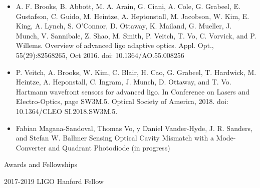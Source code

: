 \documentclass[12pt,suthesis]{report}
\begin{document}
\begin{itemize}
	\item{A. F. Brooks, B. Abbott, M. A. Arain, G. Ciani, A. Cole, G. Grabeel, E. Gustafson,
	C. Guido, M. Heintze, A. Heptonstall, M. Jacobson, W. Kim, E. King, A. Lynch,
	S. O’Connor, D. Ottaway, K. Mailand, G. Mueller, J. Munch, V. Sannibale, Z. Shao,
	M. Smith, P. Veitch, T. Vo, C. Vorvick, and P. Willems. Overview of advanced ligo
	adaptive optics. Appl. Opt., 55(29):8256{8265, Oct 2016. doi: 10.1364/AO.55.008256}}
	\item{P. Veitch, A. Brooks, W. Kim, C. Blair, H. Cao, G. Grabeel, T. Hardwick, M. Heintze,
	A. Heponstall, C. Ingram, J. Munch, D. Ottaway, and T. Vo. Hartmann wavefront
	sensors for advanced ligo. In Conference on Lasers and Electro-Optics, page SW3M.5.
	Optical Society of America, 2018. doi: 10.1364/CLEO SI.2018.SW3M.5.}
	\item{Fabian Magana-Sandoval, Thomas Vo, y Daniel Vander-Hyde, J. R. Sanders, and Stefan W. Ballmer Sensing Optical Cavity Mismatch with a Mode-Converter and Quadrant Photodiode (in progress)}
\end{itemize} 

\noindent Awards and Fellowships

2017-2019 LIGO Hanford Fellow

\finishvita
\end{document}
